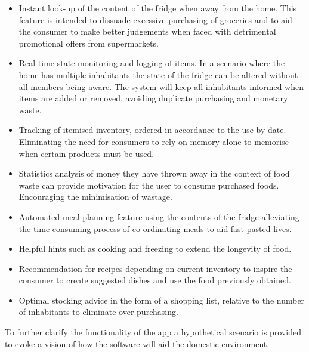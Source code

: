 \documentclass[a4paper, 11pt]{article}
\begin{document}
\begin{itemize}
  \item Instant look-up of the content of the fridge when away from the home. This feature is intended to dissuade excessive purchasing of groceries and to aid the consumer to make better judgements when faced with detrimental promotional offers from supermarkets.
  
  \item Real-time state monitoring and logging of items. In a scenario where the home has multiple inhabitants the state of the fridge can be altered without all members being aware. The system will keep all inhabitants informed when items are added or removed, avoiding duplicate purchasing and monetary waste.
  
  \item Tracking of itemised inventory, ordered in accordance to the use-by-date. Eliminating the need for consumers to rely on memory alone to memorise when certain products must be used.
  
  \item Statistics analysis of money they have thrown away in the context of food waste can provide motivation for the user to consume purchased foods. Encouraging the minimisation of wastage.
   
   \item Automated meal planning feature using the contents of the fridge alleviating the time consuming process of co-ordinating meals to aid fast pasted lives.
    
   \item Helpful hints such as cooking and freezing to extend the longevity of food. 
   
   \item Recommendation for recipes depending on current inventory to inspire the consumer to create suggested dishes and use the food previously obtained. 

   \item Optimal stocking advice in the form of a shopping list, relative to the number of inhabitants to eliminate over purchasing. 
\end{itemize}

To further clarify the functionality of the app a hypothetical scenario is provided to evoke a vision of how the software will aid the domestic environment. 
\end{document}
